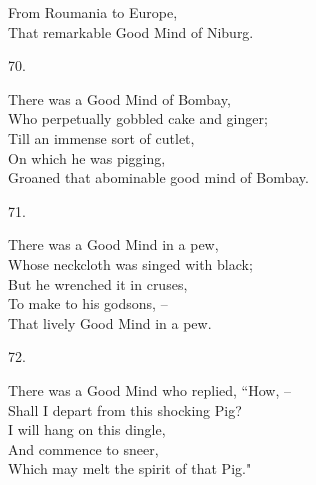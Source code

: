 \documentclass{book}
\begin{document}
{\hspace*{14mm}       From Roumania to Europe, \\
\hspace*{14mm}       That remarkable Good Mind of Niburg.
\begin{center}
    70.
\end{center}
\par
\noindent
\hspace*{14mm}       There was a Good Mind of Bombay, \\
\hspace*{14mm}       Who perpetually gobbled cake and ginger; \\
\hspace*{14mm}       Till an immense sort of cutlet, \\
\hspace*{14mm}       On which he was pigging, \\
\hspace*{14mm}       Groaned that abominable good mind of Bombay.
\begin{center}
    71.
\end{center}
\par
\noindent
\hspace*{14mm}       There was a Good Mind in a pew, \\
\hspace*{14mm}       Whose neckcloth was singed with black; \\
\hspace*{14mm}       But he wrenched it in cruses, \\
\hspace*{14mm}       To make to his godsons, --  \\
\hspace*{14mm}       That lively Good Mind in a pew.
\begin{center}
    72.
\end{center}
\par
\noindent
\hspace*{14mm}       There was a Good Mind who replied, ``How, --  \\
\hspace*{14mm}       Shall I depart from this shocking Pig? \\
\hspace*{14mm}       I will hang on this dingle, \\
\hspace*{14mm}       And commence to sneer, \\
\hspace*{14mm}       Which may melt the spirit of that Pig."
}
\end{document}
